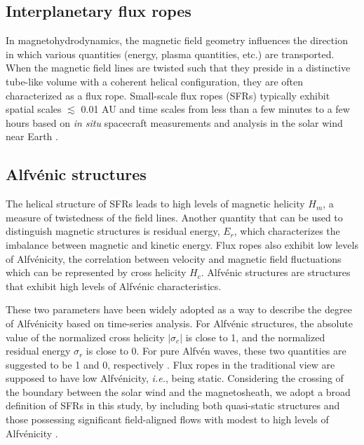 \subsection{Interplanetary flux ropes}
In magnetohydrodynamics, the magnetic field geometry influences the direction in which various quantities (energy, plasma quantities, etc.) are transported. When the magnetic field lines are twisted such that they preside in a distinctive tube-like volume with a coherent helical configuration, they are often characterized as a flux rope. Small-scale flux ropes (SFRs) typically exhibit spatial scales $\lesssim$ 0.01 AU and time scales from less than a few minutes to a few hours based on \textit{in situ} spacecraft measurements and analysis in the solar wind near Earth \citep{Cartwright:2010, Feng:2007, Hu:2018}.

\subsection{Alfv\'enic structures}
The helical structure of SFRs leads to high levels of magnetic helicity $H_m$, a measure of twistedness of the field lines. Another quantity that can be used to distinguish magnetic structures is residual energy, $E_r$, which characterizes the imbalance between magnetic and kinetic energy. Flux ropes also exhibit low levels of Alfv\'enicity, the correlation between velocity and magnetic field fluctuations which can be represented by cross helicity $H_c$. Alfv\'enic structures are structures that exhibit high levels of Alfv\'enic characteristics.


These two parameters have been widely adopted as a way to describe the degree of Alfv\'enicity based on time-series analysis. For Alfv\'enic structures, the absolute value of the normalized cross helicity $|\sigma_c|$ is close to 1, and the normalized residual energy $\sigma_r$ is close to 0. For pure Alfv\'en waves, these two quantities are suggested to be 1 and 0, respectively \citep{Bruno:2013}. Flux ropes in the traditional view are supposed to have low Alfv\'enicity, \textit{i.e.}, being static. Considering the crossing of the boundary between the solar wind and the magnetosheath, we adopt a broad definition of SFRs in this study, by including both quasi-static structures and those possessing significant field-aligned flows with modest to high levels of Alfv\'enicity \citep{Chen:2022}.

